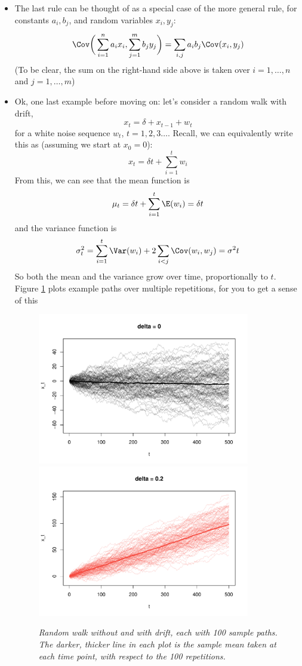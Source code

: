 \documentclass{article}
\begin{document}
\begin{itemize}
\item The last rule can be thought of as a special case of the more general
  rule, for constants $a_i,b_j$, and random variables $x_i,y_j$: 
  \[
  \Cov\bigg( \sum_{i=1}^n a_i x_i , \sum_{j=1}^m b_j y_j  \bigg) 
  = \sum_{i,j} a_i b_j \Cov(x_i, y_j)
  \]
  (To be clear, the sum on the right-hand side above is taken over $i =
  1,\dots,n$ and $j = 1,\dots,m$) 

\item Ok, one last example before moving on: let's consider a random walk with
  drift,
  \[
  x_t = \delta + x_{t-1} + w_t
  \]
  for a white noise sequence $w_t$, $t = 1,2,3\dots$.  Recall, we can
  equivalently write this as (assuming we start at $x_0 = 0$):  
  \[
  x_t = \delta t + \sum_{i=1}^t w_i 
  \] 
  From this, we can see that the mean function is 
  \[
  \mu_t = \delta t + \sum_{i=1}^t \E(w_i) = \delta t
  \]
  and the variance function is 
  \[
  \sigma^2_t = \sum_{i=1}^t \Var(w_i) + 2 \sum_{i<j} \Cov(w_i, w_j) = \sigma^2 t 
  \]
  So both the mean and the variance grow over time, proportionally to $t$. 
  Figure \ref{fig:rw} plots example paths over multiple repetitions, for you to
  get a sense of this 

\begin{figure}[p]
\centering
\includegraphics[width=0.875\textwidth]{fig/rw-1.pdf}
\includegraphics[width=0.875\textwidth]{fig/rw-2.pdf}
\caption{\it Random walk without and with drift, each with 100 sample paths. The
  darker, thicker line in each plot is the sample mean taken at each time point,
  with respect to the 100 repetitions.}
\label{fig:rw}
\end{figure}
\end{itemize}
\end{document}
